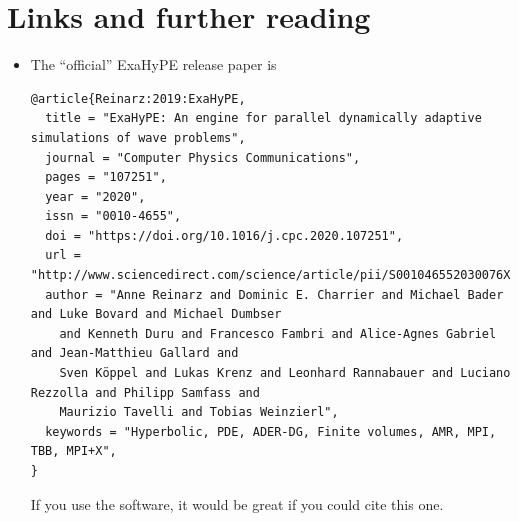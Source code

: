  


\section*{Links and further reading}

\begin{itemize}
  \item The ``official'' ExaHyPE release paper is
{\tiny \begin{verbatim}
@article{Reinarz:2019:ExaHyPE,   
  title = "ExaHyPE: An engine for parallel dynamically adaptive simulations of wave problems",
  journal = "Computer Physics Communications",
  pages = "107251",
  year = "2020",
  issn = "0010-4655",
  doi = "https://doi.org/10.1016/j.cpc.2020.107251",
  url = "http://www.sciencedirect.com/science/article/pii/S001046552030076X",
  author = "Anne Reinarz and Dominic E. Charrier and Michael Bader and Luke Bovard and Michael Dumbser 
    and Kenneth Duru and Francesco Fambri and Alice-Agnes Gabriel and Jean-Matthieu Gallard and 
    Sven Köppel and Lukas Krenz and Leonhard Rannabauer and Luciano Rezzolla and Philipp Samfass and 
    Maurizio Tavelli and Tobias Weinzierl",
  keywords = "Hyperbolic, PDE, ADER-DG, Finite volumes, AMR, MPI, TBB, MPI+X",
}
  \end{verbatim}}
  If you use the software, it would be great if you could cite this one.
\end{itemize}

